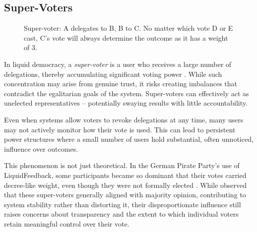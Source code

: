 \subsection*{Super-Voters}\label{subsec:bg_supervoter}
\begin{figure}[H]
  \centering
  \caption{Super-voter: A delegates to B, B to C. No matter which vote D or E cast, C's vote will always determine the outcome as it has a weight of 3.}
  \label{fig:delegation-supervoter}
\end{figure}

In liquid democracy, a \textit{super-voter} is a user who receives a large number of delegations, thereby accumulating significant voting power \citep{kling2015votingbehaviourpoweronline}. While such concentration may arise from genuine trust, it risks creating imbalances that contradict the egalitarian goals of the system. Super-voters can effectively act as unelected representatives -- potentially swaying results with little accountability.

Even when systems allow voters to revoke delegations at any time, many users may not actively monitor how their vote is used. This can lead to persistent power structures where a small number of users hold substantial, often unnoticed, influence over outcomes.

This phenomenon is not just theoretical. In the German Pirate Party's use of LiquidFeedback, some participants became so dominant that their votes carried decree-like weight, even though they were not formally elected \citep{sven_becker_liquid_2012, kling2015votingbehaviourpoweronline}. While \citet{kling2015votingbehaviourpoweronline} observed that these super-voters generally aligned with majority opinion, contributing to system stability rather than distorting it, their disproportionate influence still raises concerns about transparency and the extent to which individual voters retain meaningful control over their vote.

